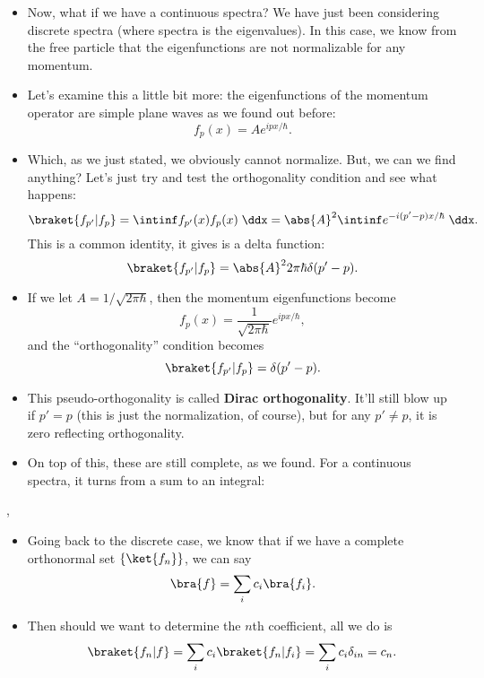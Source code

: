 \begin{itemize}
    \item Now, what if we have a continuous spectra? We have just been considering discrete spectra (where spectra is the eigenvalues). In this case, we know from the free particle that the eigenfunctions are not normalizable for any momentum.
    \item Let's examine this a little bit more: the eigenfunctions of the momentum operator are simple plane waves as we found out before:
        \begin{equation*}
            f_p(x) = Ae^{ipx/\hbar}.
        \end{equation*}
    \item Which, as we just stated, we obviously cannot normalize. But, we can we find anything? Let's just try and test the orthogonality condition and see what happens:
        \begin{equation*}
            \braket{f_{p'}|f_p} = \intinf f_{p'}(x)f_p(x) \;\ddx = \abs{A}^2\intinf e^{-i(p'-p)x/\hbar}\;\ddx.
        \end{equation*}
        This is a common identity, it gives is a delta function:
        \begin{equation*}
            \braket{f_{p'}|f_p} = \abs{A}^2 2\pi\hbar\delta(p'-p).
        \end{equation*}
    \item If we let $A = 1/\sqrt{2\pi\hbar}$, then the momentum eigenfunctions become
        \begin{equation*}
            f_p(x) = \frac{1}{\sqrt{2\pi\hbar}}e^{ipx/\hbar},
        \end{equation*}
        and the ``orthogonality'' condition becomes
        \begin{equation*}
            \braket{f_{p'}|f_p} = \delta(p'-p).
        \end{equation*}
    \item This pseudo-orthogonality is called \textbf{Dirac orthogonality}. It'll still blow up if $p'=p$ (this is just the normalization, of course), but for any $p'\neq p$, it is zero reflecting orthogonality.
    \item On top of this, these are still complete, as we found. For a continuous spectra, it turns from a sum to an integral:
\end{itemize}


\sep


\begin{itemize}
    \item Going back to the discrete case, we know that if we have a complete orthonormal set $\{\ket{f_n}\}$, we can say
        \begin{equation*}
            \bra{f} = \sum_i c_i \bra{f_i}.
        \end{equation*}
    \item Then should we want to determine the $n$th coefficient, all we do is
        \begin{equation*}
            \braket{f_n | f} = \sum_i c_i \braket{f_n | f_i} = \sum_i c_i \delta_{in} = c_n.
        \end{equation*}
\end{itemize}




